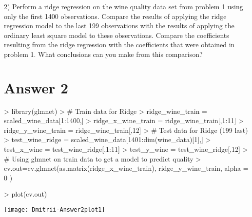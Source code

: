 \documentclass{article}
\begin{document}
2) Perform a ridge regression on the wine quality data set from problem 1
using only the first 1400 observations. Compare the results of applying the
ridge regression model to the last 199 observations with the results of
applying the ordinary least square model to these observations. Compare the
coefficients resulting from the ridge regression with the coefficients that were
obtained in problem 1. What conclusions can you make from this
comparison?

\section*{Answer 2}
\begin{Schunk}
\begin{Sinput}
> library(glmnet)
> # Train data for Ridge
> ridge_wine_train = scaled_wine_data[1:1400,]
> ridge_x_wine_train = ridge_wine_train[,1:11]
> ridge_y_wine_train = ridge_wine_train[,12]
> # Test data for Ridge (199 last)
> test_wine_ridge = scaled_wine_data[1401:dim(wine_data)[1],]
> test_x_wine = test_wine_ridge[,1:11]
> test_y_wine = test_wine_ridge[,12]
> # Using glmnet on train data to get a model to predict quality
> cv.out=cv.glmnet(as.matrix(ridge_x_wine_train), ridge_y_wine_train, alpha = 0 )
\end{Sinput}
\end{Schunk}
\begin{Schunk}
\begin{Sinput}
> plot(cv.out)
\end{Sinput}
\end{Schunk}
\texttt{[image: Dmitrii-Answer2plot1]}
\end{document}
